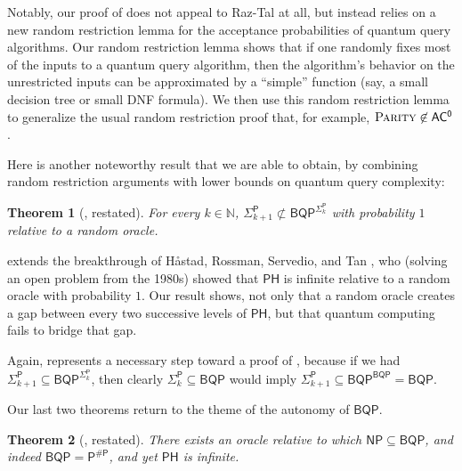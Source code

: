 \documentclass[11pt]{article}%
\newtheorem{theorem}{Theorem}
\newcommand{\Naturals}{\mathbb{N}}
\newcommand{\PARITY}{\normalfont\textsc{Parity}}
\begin{document}
Notably, our proof of  does not appeal to Raz-Tal at all, but instead relies on a new random restriction lemma for the acceptance probabilities of quantum query algorithms. Our random restriction lemma shows that if one randomly fixes most of the inputs to a quantum query algorithm, then the algorithm's behavior on the unrestricted inputs can be approximated by a ``simple'' function (say, a small decision tree or small DNF formula). We then use this random restriction lemma to generalize the usual random restriction proof that, for example, $\PARITY \not\in \mathsf{AC^0}$ \cite{Has87}.

\bigskip

Here is another noteworthy result that we are able to obtain, by
combining random restriction arguments with lower bounds on quantum query complexity:

\begin{theorem}[, restated]
\label{thm:bqp_sigma_k_intro}
For every $k \in \Naturals$, $\mathsf{\Sigma}_{k+1}^\mathsf{P} \not\subset \mathsf{BQP}^{\mathsf{\Sigma}_{k}^\mathsf{P}}$ with probability $1$ relative to a random oracle.
\end{theorem}

 extends the breakthrough of H\r{a}stad, Rossman, Servedio, and Tan \cite{HRST17}, who (solving an open problem from the 1980s) showed that $\mathsf{PH}$ is infinite relative to a random oracle with probability $1$.  Our result shows, not only that a random oracle creates a gap between every two successive levels of $\mathsf{PH}$, but that quantum computing fails to bridge that gap.

Again,  represents a necessary step toward a proof of , because if we had $\mathsf{\Sigma}_{k+1}^\mathsf{P} \subseteq \mathsf{BQP}^{\mathsf{\Sigma}_{k}^\mathsf{P}}$, then clearly $\mathsf{\Sigma}_k^\mathsf{P} \subseteq \mathsf{BQP}$ would imply $\mathsf{\Sigma}_{k+1}^\mathsf{P} \subseteq \mathsf{BQP}^\mathsf{BQP} = \mathsf{BQP}$.

\bigskip

Our last two theorems return to the theme of the autonomy of $\mathsf{BQP}$.

\begin{theorem}[, restated]
\label{thm:np_in_bqp_ph_infinite_intro}
There exists an oracle relative to which $\mathsf{NP} \subseteq \mathsf{BQP}$, and indeed $\mathsf{BQP} = \mathsf{P^{\# P}}$, and yet $\mathsf{PH}$ is infinite.
\end{theorem}
\end{document}
